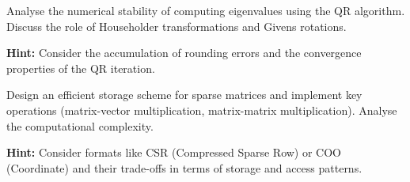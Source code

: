 \begin{problem}
Analyse the numerical stability of computing eigenvalues using the QR algorithm. Discuss the role of Householder transformations and Givens rotations.

\textbf{Hint:} Consider the accumulation of rounding errors and the convergence properties of the QR iteration.
\end{problem}

\begin{problem}
Design an efficient storage scheme for sparse matrices and implement key operations (matrix-vector multiplication, matrix-matrix multiplication). Analyse the computational complexity.

\textbf{Hint:} Consider formats like CSR (Compressed Sparse Row) or COO (Coordinate) and their trade-offs in terms of storage and access patterns.
\end{problem}

